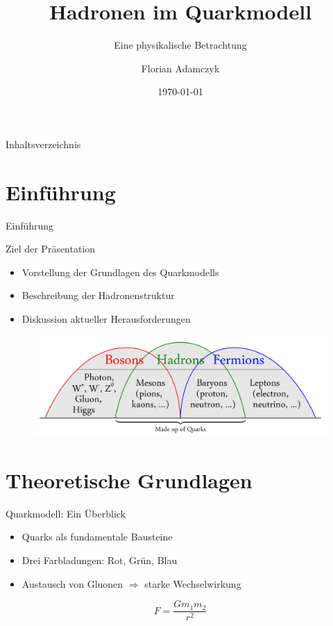 \documentclass[aspectratio=169]{beamer} %
\title{Hadronen im Quarkmodell}
\subtitle{Eine physikalische Betrachtung}
\author{Florian Adamczyk}
\date{\today}
\begin{document}
    
    \begin{frame}\titlepage\end{frame}
    
    \begin{frame}{Inhaltsverzeichnis}
        \tableofcontents
    \end{frame}
    
    \section{Einführung}
    \begin{frame}{Einführung}
        \begin{block}{Ziel der Präsentation}
            \begin{itemize}
                \item Vorstellung der Grundlagen des Quarkmodells
                \item Beschreibung der Hadronenstruktur
                \item Diskussion aktueller Herausforderungen
            \end{itemize}
        \end{block}
        \begin{figure}
            \centering
            \includegraphics[width=0.6\linewidth]{Bosons-Hadrons-Fermions-RGB-png2.png}
        \end{figure}
    \end{frame}
    
    \section{Theoretische Grundlagen}
    \begin{frame}{Quarkmodell: Ein Überblick}
        \begin{itemize}
            \item Quarks als fundamentale Bausteine
            \item Drei Farbladungen: Rot, Grün, Blau
            \item Austausch von Gluonen $\Rightarrow$ starke Wechselwirkung
        \end{itemize}
        \begin{equation*}
            F = \frac{Gm_1m_2}{r^2} %
        \end{equation*}
    \end{frame}
    
\end{document}
